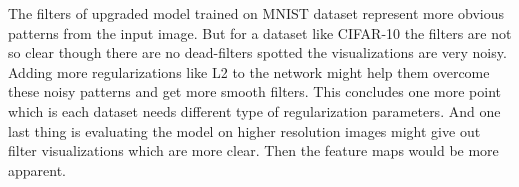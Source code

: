 \noindent The filters of upgraded model trained on MNIST dataset represent more obvious patterns from the input image. But for a dataset like CIFAR-10 the filters are not so clear though there are no dead-filters spotted the visualizations are very noisy. Adding more regularizations like L2 to the network might help them overcome these noisy patterns and get more smooth filters. This concludes one more point which is each dataset needs different type of regularization parameters. And one last thing is evaluating the model on higher resolution images might give out filter visualizations which are more clear. Then the feature maps would be more apparent. 

